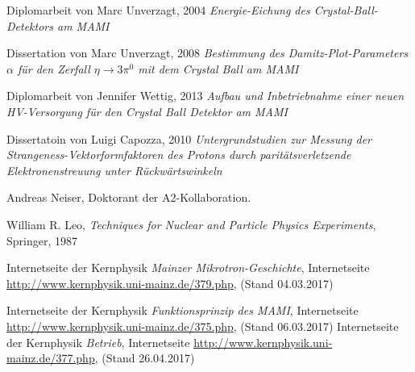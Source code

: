\documentclass[a4paper,11pt,oneside,final,german,openbib,pdftex]{scrbook}
\begin{document}
{\begin{appendix}



\renewcommand{\bibname}{\bfont Literaturverzeichnis} 

\begin{thebibliography}{99}
	
 Diplomarbeit von Marc Unverzagt, 2004 {\em Energie-Eichung des Crystal-Ball-Detektors am MAMI}

 Dissertation von Marc Unverzagt, 2008 {\em Bestimmung des Damitz-Plot-Parameters $\alpha$ für den Zerfall $ \eta \rightarrow 3\pi^{0} $ mit dem Crystal Ball am MAMI}

 Diplomarbeit von Jennifer Wettig, 2013 {\em Aufbau und Inbetriebnahme einer neuen HV-Versorgung für den Crystal Ball Detektor am MAMI}

 Dissertatoin von Luigi Capozza, 2010 {\em Untergrundstudien zur Messung der
	Strangeness-Vektorformfaktoren
	des Protons durch parit\"atsverletzende
	Elektronenstreuung unter R\"uckw\"artswinkeln}

 Andreas Neiser, Doktorant der A2-Kollaboration.

 William R. Leo, \textit{Techniques for Nuclear and Particle Physics Experiments}, Springer, 1987


 Internetseite der Kernphysik {\em Mainzer Mikrotron-Geschichte}, Internetseite \url{http://www.kernphysik.uni-mainz.de/379.php}, (Stand 04.03.2017)

 Internetseite der Kernphysik {\em Funktionsprinzip des MAMI}, Internetseite \url{http://www.kernphysik.uni-mainz.de/375.php}, (Stand 06.03.2017)
 Internetseite der Kernphysik {\em Betrieb}, Internetseite \url{http://www.kernphysik.uni-mainz.de/377.php}, (Stand 26.04.2017)


\end{thebibliography}
\end{appendix}}
\end{document}
